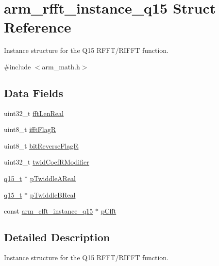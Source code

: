 \hypertarget{structarm__rfft__instance__q15}{}\section{arm\+\_\+rfft\+\_\+instance\+\_\+q15 Struct Reference}
\label{structarm__rfft__instance__q15}


Instance structure for the Q15 R\+F\+F\+T/\+R\+I\+F\+FT function.  




{\ttfamily \#include $<$arm\+\_\+math.\+h$>$}

\subsection*{Data Fields}
\begin{DoxyCompactItemize}
\item 
uint32\+\_\+t \hyperlink{structarm__rfft__instance__q15_adf0d4604cf5546075d9d4cf122d6c986}{fft\+Len\+Real}
\item 
uint8\+\_\+t \hyperlink{structarm__rfft__instance__q15_a787d72055c89e4d62b188d6bd646341c}{ifft\+FlagR}
\item 
uint8\+\_\+t \hyperlink{structarm__rfft__instance__q15_ad56ec2425e2422108b8767b43d944591}{bit\+Reverse\+FlagR}
\item 
uint32\+\_\+t \hyperlink{structarm__rfft__instance__q15_a5b06f7f76c018db993fe6acc5708c589}{twid\+Coef\+R\+Modifier}
\item 
\hyperlink{arm__math_8h_ab5a8fb21a5b3b983d5f54f31614052ea}{q15\+\_\+t} $\ast$ \hyperlink{structarm__rfft__instance__q15_ac17beaa033ab1ea242d49037276b67e2}{p\+Twiddle\+A\+Real}
\item 
\hyperlink{arm__math_8h_ab5a8fb21a5b3b983d5f54f31614052ea}{q15\+\_\+t} $\ast$ \hyperlink{structarm__rfft__instance__q15_a67a618de57c3a7420ee05fda1a80bf3a}{p\+Twiddle\+B\+Real}
\item 
const \hyperlink{structarm__cfft__instance__q15}{arm\+\_\+cfft\+\_\+instance\+\_\+q15} $\ast$ \hyperlink{structarm__rfft__instance__q15_abd0c3c04ec88379f48e51447e95f092a}{p\+Cfft}
\end{DoxyCompactItemize}


\subsection{Detailed Description}
Instance structure for the Q15 R\+F\+F\+T/\+R\+I\+F\+FT function. 

